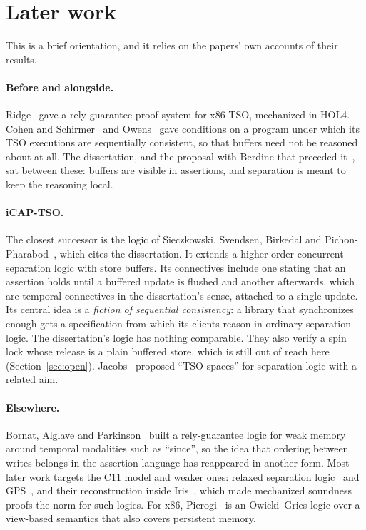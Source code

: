 \section{Later work}
\label{sec:related}

This is a brief orientation, and it relies on the papers' own accounts of
their results.

\paragraph{Before and alongside.}
Ridge~\cite{ridge10} gave a rely-guarantee proof system for x86-TSO,
mechanized in HOL4. Cohen and Schirmer~\cite{cohen10} and
Owens~\cite{owens10} gave conditions on a program under which its TSO
executions are sequentially consistent, so that buffers need not be
reasoned about at all. The dissertation, and the proposal with Berdine
that preceded it~\cite{wehrman11}, sat between these: buffers are visible
in assertions, and separation is meant to keep the reasoning local.

\paragraph{iCAP-TSO.}
The closest successor is the logic of Sieczkowski, Svendsen, Birkedal and
Pichon-Pharabod~\cite{sieczkowski15}, which cites the dissertation. It
extends a higher-order concurrent separation logic with store buffers. Its
connectives include one stating that an assertion holds until a buffered
update is flushed and another afterwards, which are temporal connectives
in the dissertation's sense, attached to a single update. Its central idea
is a \emph{fiction of sequential consistency}: a library that synchronizes
enough gets a specification from which its clients reason in ordinary
separation logic. The dissertation's logic has nothing comparable. They
also verify a spin lock whose release is a plain buffered store, which is
still out of reach here (Section~\ref{sec:open}). Jacobs~\cite{jacobs14}
proposed ``TSO spaces'' for separation logic with a related aim.

\paragraph{Elsewhere.}
Bornat, Alglave and Parkinson~\cite{bornat15} built a rely-guarantee logic
for weak memory around temporal modalities such as ``since'', so the idea
that ordering between writes belongs in the assertion language has
reappeared in another form. Most later work targets the C11 model and
weaker ones: relaxed separation logic~\cite{vafeiadis13} and
GPS~\cite{turon14}, and their reconstruction inside Iris~\cite{kaiser17},
which made mechanized soundness proofs the norm for such logics. For x86,
Pierogi~\cite{bila22} is an Owicki--Gries logic over a view-based
semantics that also covers persistent memory.

